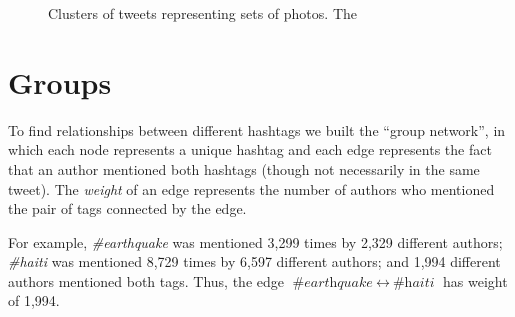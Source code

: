 \documentclass[a4paper, 11pt, titlepage]{article}
\begin{document}
\begin{figure}[h]
\centering
{}
\quad
{}
\caption{Clusters of tweets representing sets of photos.  The }
\label{fig:rt_net_photos}
\end{figure}

\section{Groups}

To find relationships between different hashtags we built the ``group network'', in which each node represents a unique hashtag and each edge represents the fact that an author mentioned both hashtags (though not necessarily in the same tweet). The \textit{weight} of an edge represents the number of authors who mentioned the pair of tags connected by the edge. 

For example, \textit{\#earthquake} was mentioned 3,299 times by 2,329 different authors; \textit{\#haiti} was mentioned 8,729 times by 6,597 different authors; and 1,994 different authors mentioned both tags. Thus, the edge $\textit{\#earthquake}~\leftrightarrow~\textit{\#haiti}$ has weight of 1,994.
\end{document}
